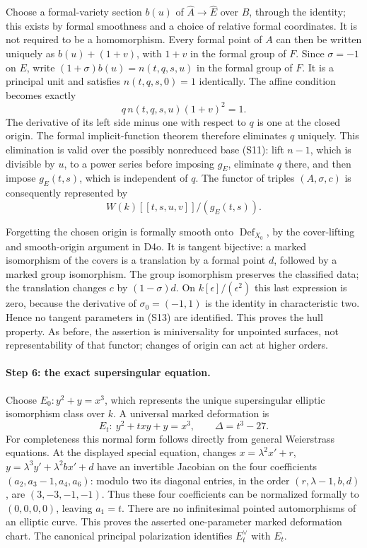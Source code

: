 Choose a formal-variety section $b(u)$ of
$\widehat A\to\widehat E$ over $B$, through the identity; this
exists by formal smoothness and a choice of relative formal
coordinates. It is not required to be a homomorphism. Every formal
point of $A$ can then be written uniquely as $b(u)+(1+v)$, with
$1+v$ in the formal group of $F$. Since $\sigma=-1$ on $E$,
write $(1+\sigma)b(u)=n(t,q,s,u)$ in the formal group of $F$.
It is a principal unit and satisfies $n(t,q,s,0)=1$ identically.
The affine condition becomes exactly
\[
                 q\,n(t,q,s,u)(1+v)^2=1.               \tag{S12}
\]
The derivative of its left side minus one with respect to $q$ is
one at the closed origin. The formal implicit-function theorem
therefore eliminates $q$ uniquely. This elimination is valid over
the possibly nonreduced base (S11): lift $n-1$, which is divisible
by $u$, to a power series before imposing $g_E$, eliminate $q$
there, and then impose $g_E(t,s)$, which is independent of $q$.
The functor of triples $(A,\sigma,c)$ is consequently represented
by
\[
                    W(k)[[t,s,u,v]]/(g_E(t,s)).          \tag{S13}
\]

Forgetting the chosen origin is formally smooth onto
$\operatorname{Def}_{X_0}$, by the cover-lifting and smooth-origin
argument in D4o. It is tangent bijective: a marked isomorphism of
the covers is a translation by a formal point $d$, followed by a
marked group isomorphism. The group isomorphism preserves the
classified data; the translation changes $c$ by $(1-\sigma)d$.
On $k[\epsilon]/(\epsilon^2)$ this last expression is zero,
because the derivative of $\sigma_0=(-1,1)$ is the identity in
characteristic two. Hence no tangent parameters in (S13) are
identified. This proves the hull property. As before, the assertion
is miniversality for unpointed surfaces, not representability of that
functor; changes of origin can act at higher orders.

\paragraph{Step 6: the exact supersingular equation.}
Choose $E_0:y^2+y=x^3$, which represents the unique supersingular
elliptic isomorphism class over $k$. A universal marked deformation
is
\[
                  E_t:\ y^2+txy+y=x^3,
                  \qquad\Delta=t^3-27.                 \tag{S14}
\]
For completeness this normal form follows directly from general
Weierstrass equations. At the displayed special equation, changes
$x=\lambda^2x'+r$, $y=\lambda^3y'+\lambda^2 b x'+d$ have an
invertible Jacobian on the four coefficients
$(a_2,a_3-1,a_4,a_6)$: modulo two its diagonal entries, in the
order $(r,\lambda-1,b,d)$, are $(3,-3,-1,-1)$.
Thus these four coefficients can be normalized formally to
$(0,0,0,0)$, leaving $a_1=t$. There are no infinitesimal pointed
automorphisms of an elliptic curve. This proves the asserted
one-parameter marked deformation chart. The canonical principal
polarization identifies $E_t^\vee$ with $E_t$.

